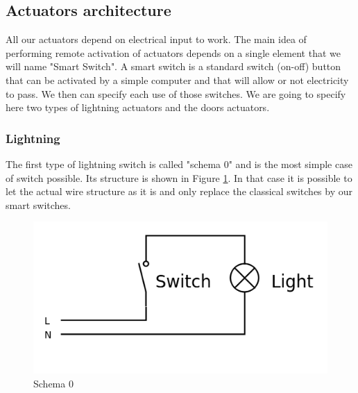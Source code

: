 \documentclass{acm_proc_article-sp}
\begin{document}
\subsection{Actuators architecture}
All our actuators depend on electrical input to work. The main idea of performing remote activation of actuators depends on a single element that we will name "Smart Switch".
A smart switch is a standard switch (on-off) button that can be activated by a simple computer and that will allow or not electricity to pass.
We then can specify each use of those switches.
We are going to specify here two types of lightning actuators and the doors actuators.
\subsubsection{Lightning}
The first type of lightning switch is called "schema 0" and is the most simple case of switch possible.
Its structure is shown in Figure \ref{schema0}.
In that case it is possible to let the actual wire structure as it is and only replace the classical switches by our smart switches.

				\begin{figure}[htb]
  				\begin{center}
    				\includegraphics[width=\linewidth]{schema0}
    				\caption{Schema 0 \label{schema0}}
  				\end{center}
				\end{figure}
\end{document}
